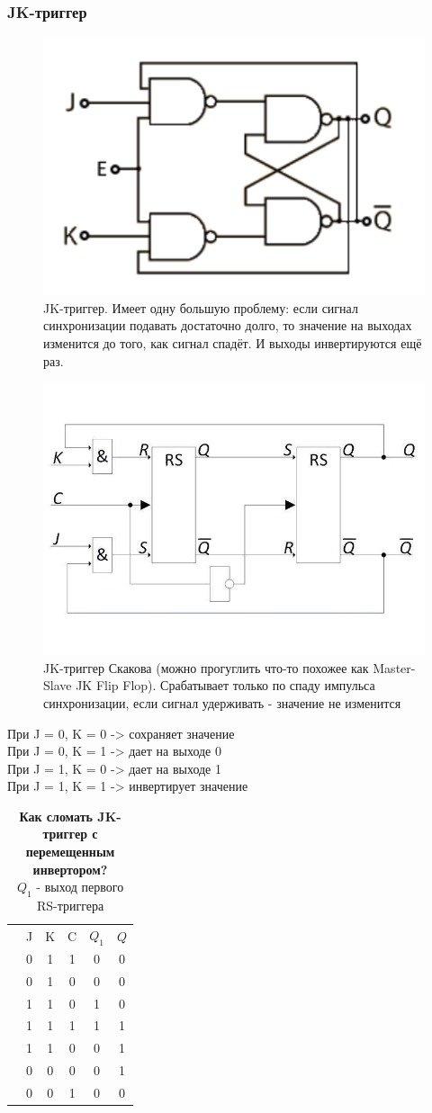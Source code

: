 \documentclass[12pt, a4paper]{article}
\begin{document}
\subsubsection{JK-триггер}
\begin{figure}[h!]
    \includegraphics[width=0.5\linewidth]{./images/3_24.png}
    \caption{JK-триггер. Имеет одну большую проблему: если сигнал синхронизации подавать достаточно долго, то значение на выходах изменится до того, как сигнал спадёт. И выходы инвертируются ещё раз.}
    \label{fig:my_label}
\end{figure}
\begin{figure}[h!]
    \includegraphics[width=0.4\linewidth]{./images/JK.jpg}
    \caption{JK-триггер Скакова (можно прогуглить что-то похожее как Master-Slave JK Flip Flop). Срабатывает только по спаду импульса синхронизации, если сигнал удерживать - значение не изменится}
    \label{fig:my_label}
\end{figure}
При J = 0, K = 0 -> сохраняет значение\\
При J = 0, K = 1 -> дает на выходе 0\\
При J = 1, K = 0 -> дает на выходе 1\\
При J = 1, K = 1 -> инвертирует значение\\
\begin{table}[h!]
    \centering
    \begin{tabular}{c|c|c|c|c|c|}
         & J & K & C & $Q_1$ & $Q$ \\
         & 0 & 1 & 1 & 0 & 0\\
         & 0 & 1 & 0 & 0 & 0\\
         & 1 & 1 & 0 & 1 & 0\\
         & 1 & 1 & 1 & 1 & 1\\
         & 1 & 1 & 0 & 0 & 1\\
         & 0 & 0 & 0 & 0 & 1\\
         & 0 & 0 & 1 & 0 & 0
    \end{tabular}
    \caption{\textbf{Как сломать JK-триггер с перемещенным инвертором?}\\$Q_1$ - выход первого RS-триггера}
    \label{tab:my_label}
\end{table}
\end{document}
